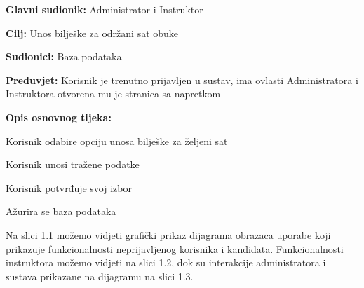  \noindent {}
	\begin{packed_item}
		
		\item \textbf{Glavni sudionik:} Administrator i Instruktor
		\item  \textbf{Cilj:} Unos bilješke za održani sat obuke
		\item  \textbf{Sudionici:} Baza podataka
		\item  \textbf{Preduvjet:} Korisnik je trenutno prijavljen u sustav, ima ovlasti Administratora i Instruktora otvorena mu je stranica sa napretkom
		\item  \textbf{Opis osnovnog tijeka:}
		
		\item[] \begin{packed_enum}
			
			\item Korisnik odabire opciju unosa bilješke za željeni sat 
                \item Korisnik unosi tražene podatke
                \item Korisnik potvrđuje svoj izbor 
                \item Ažurira se baza podataka 
                
			
		\end{packed_enum}
		
	\end{packed_item}

 \noindent Na slici 1.1 možemo vidjeti grafički prikaz dijagrama obrazaca uporabe koji prikazuje funkcionalnosti neprijavljenog korisnika i kandidata. Funkcionalnosti instruktora možemo vidjeti na slici 1.2, dok su interakcije administratora i sustava prikazane na dijagramu na slici 1.3.


